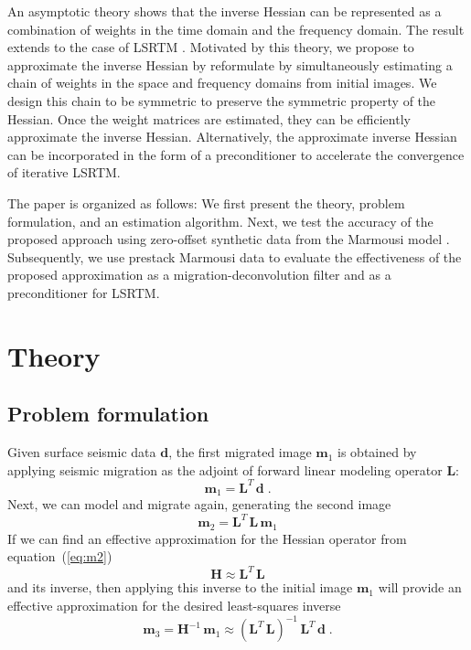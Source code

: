 An asymptotic theory \cite[]{miller1987,bleistein1987} shows that the inverse Hessian can be represented as a combination of weights in the time domain and the frequency domain. The result extends to the case of LSRTM \cite[]{hou15,hou16}. Motivated by this theory,
we propose to approximate the inverse Hessian by reformulate by simultaneously estimating a chain of weights in the space and frequency domains from initial images. We design this chain to be symmetric to preserve the symmetric property of the Hessian.
Once the weight matrices are estimated, they can be efficiently approximate the inverse Hessian. Alternatively, the approximate inverse Hessian can be incorporated in the form of a preconditioner to accelerate the convergence of iterative LSRTM.

The paper is organized as follows: We first present the theory, problem formulation, and an estimation algorithm. Next, we test the accuracy of the proposed approach using zero-offset synthetic data from the Marmousi model \cite[]{versteeg1994}. Subsequently, we use prestack Marmousi data  to evaluate the effectiveness of the proposed approximation as a migration-deconvolution filter and as a preconditioner for LSRTM.


\section{Theory}


\subsection*{Problem formulation}
Given surface seismic data $\mathbf{d}$, the first migrated image $\mathbf{m}_1$ is obtained by applying seismic migration as the adjoint of forward linear modeling operator $\mathbf{L}$:
\begin{equation}
\label{eq:m1}
    \mathbf{m}_1=\mathbf{L}^{T}\,\mathbf{d}\;.
\end{equation}
Next, we can model and migrate again, generating the second image
\begin{equation}
\label{eq:m2}
    \mathbf{m}_2=\mathbf{L}^{T}\,\mathbf{L\,m}_1
\end{equation}
If we can find an effective approximation for the Hessian operator from equation~(\ref{eq:m2})
\begin{equation}
\label{eq:hessian}
    \mathbf{H} \approx \mathbf{L}^{T}\,\mathbf{L}
\end{equation}
and its inverse, then applying this inverse to the initial image $\mathbf{m}_1$ will provide an effective approximation for the desired least-squares inverse
\begin{equation}
\label{eq:m3}
    \mathbf{m}_3=\mathbf{H}^{-1}\,\mathbf{m}_1 
    \approx \left(\mathbf{L}^{T}\,\mathbf{L}\right)^{-1}\,\mathbf{L}^{T}\,\mathbf{d}\;.
\end{equation}


